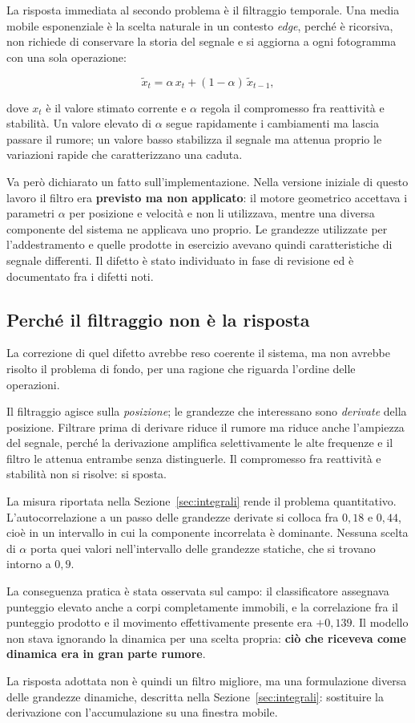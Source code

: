 La risposta immediata al secondo problema è il filtraggio temporale. Una media
mobile esponenziale è la scelta naturale in un contesto \emph{edge}, perché è
ricorsiva, non richiede di conservare la storia del segnale e si aggiorna a
ogni fotogramma con una sola operazione:

\[
\tilde{x}_t = \alpha\,x_t + (1-\alpha)\,\tilde{x}_{t-1},
\]

dove $x_t$ è il valore stimato corrente e $\alpha$ regola il compromesso fra
reattività e stabilità. Un valore elevato di $\alpha$ segue rapidamente i
cambiamenti ma lascia passare il rumore; un valore basso stabilizza il segnale
ma attenua proprio le variazioni rapide che caratterizzano una caduta.

Va però dichiarato un fatto sull'implementazione. Nella versione iniziale di
questo lavoro il filtro era \textbf{previsto ma non applicato}: il motore
geometrico accettava i parametri $\alpha$ per posizione e velocità e non li
utilizzava, mentre una diversa componente del sistema ne applicava uno proprio.
Le grandezze utilizzate per l'addestramento e quelle prodotte in esercizio
avevano quindi caratteristiche di segnale differenti. Il difetto è stato
individuato in fase di revisione ed è documentato fra i difetti noti.

\subsection{Perché il filtraggio non è la risposta}

La correzione di quel difetto avrebbe reso coerente il sistema, ma non avrebbe
risolto il problema di fondo, per una ragione che riguarda l'ordine delle
operazioni.

Il filtraggio agisce sulla \emph{posizione}; le grandezze che interessano sono
\emph{derivate} della posizione. Filtrare prima di derivare riduce il rumore ma
riduce anche l'ampiezza del segnale, perché la derivazione amplifica
selettivamente le alte frequenze e il filtro le attenua entrambe senza
distinguerle. Il compromesso fra reattività e stabilità non si risolve: si
sposta.

La misura riportata nella Sezione~\ref{sec:integrali} rende il problema
quantitativo. L'autocorrelazione a un passo delle grandezze derivate si colloca
fra $0{,}18$ e $0{,}44$, cioè in un intervallo in cui la componente incorrelata
è dominante. Nessuna scelta di $\alpha$ porta quei valori nell'intervallo delle
grandezze statiche, che si trovano intorno a $0{,}9$.

La conseguenza pratica è stata osservata sul campo: il classificatore assegnava
punteggio elevato anche a corpi completamente immobili, e la correlazione fra il
punteggio prodotto e il movimento effettivamente presente era $+0{,}139$. Il
modello non stava ignorando la dinamica per una scelta propria: \textbf{ciò che
riceveva come dinamica era in gran parte rumore}.

La risposta adottata non è quindi un filtro migliore, ma una formulazione
diversa delle grandezze dinamiche, descritta nella
Sezione~\ref{sec:integrali}: sostituire la derivazione con l'accumulazione su
una finestra mobile.
